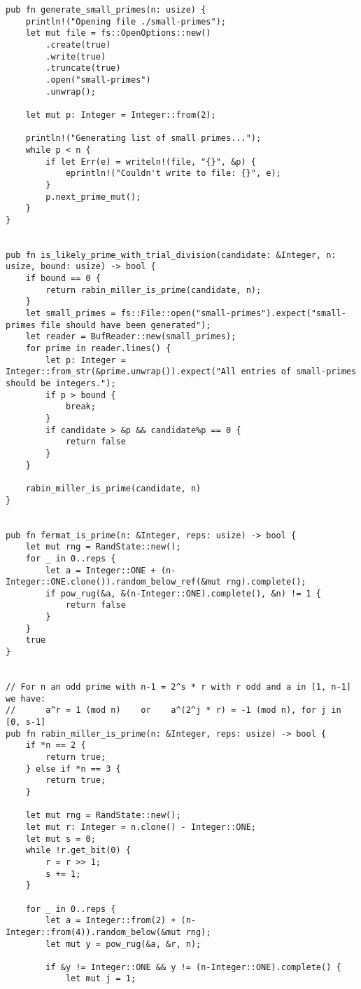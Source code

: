 \begin{verbatim}
pub fn generate_small_primes(n: usize) {
    println!("Opening file ./small-primes");
    let mut file = fs::OpenOptions::new()
        .create(true)
        .write(true)
        .truncate(true)
        .open("small-primes")
        .unwrap();

    let mut p: Integer = Integer::from(2);
    
    println!("Generating list of small primes...");
    while p < n {
        if let Err(e) = writeln!(file, "{}", &p) {
            eprintln!("Couldn't write to file: {}", e);
        }
        p.next_prime_mut();
    }
}


pub fn is_likely_prime_with_trial_division(candidate: &Integer, n: usize, bound: usize) -> bool {
    if bound == 0 {
        return rabin_miller_is_prime(candidate, n);
    }
    let small_primes = fs::File::open("small-primes").expect("small-primes file should have been generated");
    let reader = BufReader::new(small_primes);
    for prime in reader.lines() {
        let p: Integer = Integer::from_str(&prime.unwrap()).expect("All entries of small-primes should be integers.");
        if p > bound {
            break;
        }
        if candidate > &p && candidate%p == 0 {
            return false
        }         
    }

    rabin_miller_is_prime(candidate, n)
}


pub fn fermat_is_prime(n: &Integer, reps: usize) -> bool {
    let mut rng = RandState::new();
    for _ in 0..reps {
        let a = Integer::ONE + (n-Integer::ONE.clone()).random_below_ref(&mut rng).complete();
        if pow_rug(&a, &(n-Integer::ONE).complete(), &n) != 1 {
            return false
        }
    }
    true
}


// For n an odd prime with n-1 = 2^s * r with r odd and a in [1, n-1] we have: 
//      a^r = 1 (mod n)    or    a^(2^j * r) = -1 (mod n), for j in [0, s-1]
pub fn rabin_miller_is_prime(n: &Integer, reps: usize) -> bool {
    if *n == 2 {
        return true;
    } else if *n == 3 {
        return true;
    }

    let mut rng = RandState::new();
    let mut r: Integer = n.clone() - Integer::ONE;
    let mut s = 0;
    while !r.get_bit(0) {
        r = r >> 1;
        s += 1;
    }

    for _ in 0..reps {
        let a = Integer::from(2) + (n-Integer::from(4)).random_below(&mut rng);
        let mut y = pow_rug(&a, &r, n);

        if &y != Integer::ONE && y != (n-Integer::ONE).complete() {
            let mut j = 1;


\end{verbatim}

